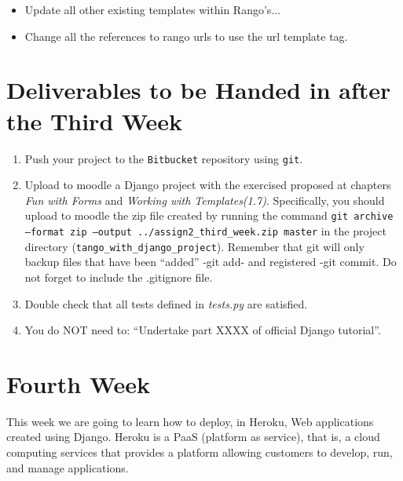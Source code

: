 \documentclass[12pt]{article} %
\newcounter{ejercicioNo}
\begin{document}
\begin{itemize}
 \item Update all other existing templates within Rango’s...
 \item Change all the references to rango urls to use the url template tag.
\end{itemize}



\section{Deliverables to be Handed in after the Third Week}

\begin{minipage}{\linewidth}
\begin{framed}
\begin{enumerate}
\item Push your project to the \texttt{Bitbucket} repository using \texttt{git}. 

\item Upload to moodle a Django project with the exercised proposed at chapters \textit{Fun with Forms} and \textit{Working with Templates(1.7)}. Specifically, you should upload to moodle the  zip file created by running the command \texttt{git archive --format zip --output ../assign2\_third\_week.zip  master} in the project directory (\texttt{tango\_with\_django\_project}). Remember that git will only backup files that have been ``added'' -git add- and registered -git commit. Do not forget to include the .gitignore file.

\item Double check that all tests defined in \textit{tests.py} are satisfied.

\item You do NOT need to: ``Undertake part XXXX of official Django tutorial''. 
\end{enumerate}
\end{framed}
\end{minipage}

\section{Fourth Week}
This week we are going to learn how to deploy, in Heroku, Web applications created using Django. Heroku is a PaaS (platform as service), that is, a cloud computing services that provides a platform allowing customers to develop, run, and manage applications.
\end{document}
